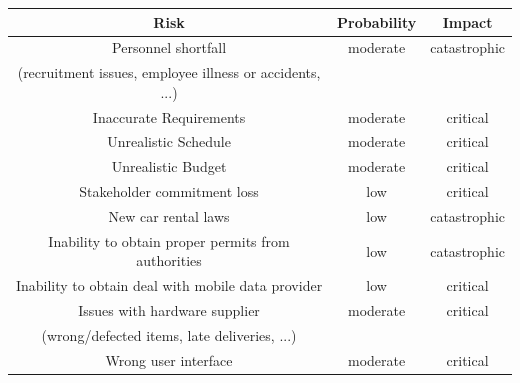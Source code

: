 \documentclass[english]{article}
\begin{document}
\begin{center}
	\begin{tabular}{|c|c|c|}
		\hline
		\textbf{Risk} & \textbf{Probability } &  \textbf{Impact} \\
		\hline
		Personnel shortfall & moderate & catastrophic\\(recruitment issues, employee illness or accidents, ...) & & \\
		\hline
		Inaccurate Requirements & moderate & critical\\
		\hline
		Unrealistic Schedule & moderate & critical\\
		\hline
		Unrealistic Budget & moderate & critical\\
		\hline
		Stakeholder commitment loss & low & critical\\
		\hline
		New car rental laws & low & catastrophic \\
		\hline
		Inability to obtain proper permits from authorities  & low & catastrophic \\
		\hline
		Inability to obtain deal with mobile data provider  & low & critical \\
		\hline		
		Issues with hardware supplier & moderate & critical \\
		(wrong/defected items, late deliveries, ...) & & \\
		\hline
		Wrong user interface & moderate & critical\\
		\hline
	\end{tabular}
\end{center}
\end{document}
